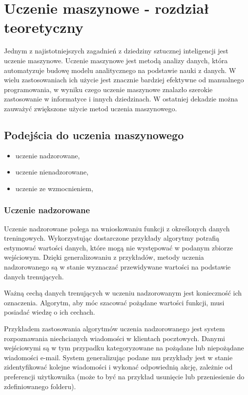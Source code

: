 \chapter{Uczenie maszynowe - rozdział teoretyczny}
\label{cha:ogolnyrozdzialteoretyczny}

Jednym z najistotniejszych zagadnień z dziedziny sztucznej inteligencji jest uczenie maszynowe. 
Uczenie maszynowe jest metodą analizy danych, która automatyzuje budowę modelu analitycznego na podstawie nauki z 
danych. W wielu zastosowaniach ich użycie jest znacznie bardziej efektywne od manualnego programowania, w wyniku czego 
uczenie maszynowe znalazło szerokie zastosowanie w informatyce i innych dziedzinach.
W ostatniej dekadzie można zauważyć zwiększone użycie metod uczenia maszynowego\cite{domingos2012few}.

\section{Podejścia do uczenia maszynowego}
\label{sec:podejsciadouczeniamaszynowego}

\begin{itemize}
 \item uczenie nadzorowane,
 \item uczenie nienadzorowane,
 \item uczenie ze wzmocnieniem,
\end{itemize}

\subsection{Uczenie nadzorowane}
\label{subsec:uczenienadzorowane}

Uczenie nadzorowane polega na wnioskowaniu funkcji z określonych danych treningowych.
Wykorzystując dostarczone przykłady algorytmy potrafią estymować wartości danych, które mogą nie występować w 
podanym zbiorze wejściowym. Dzięki generalizowaniu z przykładów, metody uczenia nadzorowanego są w stanie 
wyznaczać przewidywane wartości na podstawie danych trenujących.

Ważną cechą danych trenujących w uczeniu nadzorowanym jest konieczność ich oznaczenia. Algorytm, aby móc 
szacować pożądane wartości funkcji, musi posiadać wiedzę o ich cechach.

Przykładem zastosowania algorytmów uczenia nadzorowanego jest system rozpoznawania niechcianych wiadomości w klientach 
pocztowych. Danymi wejściowymi są w tym przypadku kategoryzowane na pożądane lub niepożądane wiadomości e-mail.
System generalizując podane mu przykłady jest w stanie zidentyfikować kolejne wiadomości i wykonać odpowiednią akcję, 
zależnie od preferencji użytkownika (może to być na przykład usunięcie lub przeniesienie do zdefiniowanego folderu).

